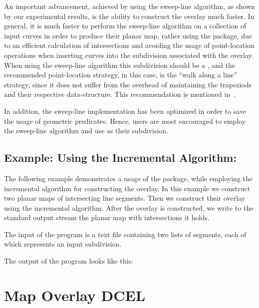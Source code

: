 \begin{ccTexOnly}
An important advancement, achieved by using the sweep-line algorithm, 
as shown by our experimental results,
is the ability to construct the overlay much faster.
In general, it is much faster to perform the sweep-line algorithm on
a collection of input curves in order to produce their planar map,
rather using the  package,
due to an efficient calculation of intersections and avoiding the usage of
point-location operations when inserting curves into the subdivision 
associated with the overlay. When using the sweep-line algorithm this 
subdivision should be a , and the recommended 
point-location strategy, in this case, is the ``walk along a line'' 
strategy, since it does not suffer from the overhead of maintaining 
the trapeziods and their respective data-structure.
This recommendation is mentioned in~.

In addition, the sweep-line implementation has been optimized in order to
save the usage of geometric predicates. 
Hence, users are most encouraged to employ the sweep-line algorithm 
and use  as their subdivision. 

\subsection*{Example: Using the Incremental Algorithm:}
The following example demonstrates a usage of the 
 package, 
while employing the incremental algorithm for constructing the overlay.
In this example we construct two planar maps of intersecting line segments. 
Then we construct their overlay using the incremental algorithm. 
After the overlay is constructed, we write to the standard output stream 
the planar map with intersections it holds. 

The input of the program is a text file containing two lists of segments, 
each of which represents an input subdivision.

The output of the program looks like this:

\section{Map Overlay DCEL}
\label{sec:dcel}


\end{ccTexOnly}

